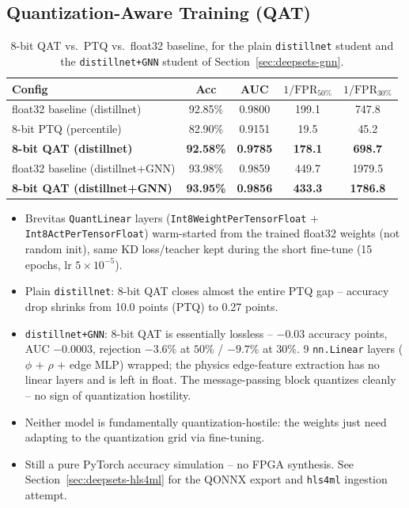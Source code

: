 \subsection{Quantization-Aware Training (QAT)}
\label{sec:deepsets-qat}

\begin{table}[h]
    \centering
    \small
    \begin{tabular}{lcccc}
        \toprule
        Config & Acc & AUC & $1/\mathrm{FPR}_{50\%}$ & $1/\mathrm{FPR}_{30\%}$ \\
        \midrule
        float32 baseline (distillnet) & 92.85\% & 0.9800 & 199.1 & 747.8 \\
        8-bit PTQ (percentile)        & 82.90\% & 0.9151 & 19.5  & 45.2  \\
        \textbf{8-bit QAT (distillnet)} & \textbf{92.58\%} & \textbf{0.9785} & \textbf{178.1} & \textbf{698.7} \\
        \midrule
        float32 baseline (distillnet+GNN)   & 93.98\% & 0.9859 & 449.7 & 1979.5 \\
        \textbf{8-bit QAT (distillnet+GNN)} & \textbf{93.95\%} & \textbf{0.9856} & \textbf{433.3} & \textbf{1786.8} \\
        \bottomrule
    \end{tabular}
    \caption{8-bit QAT vs.\ PTQ vs.\ float32 baseline, for the plain
    \texttt{distillnet} student and the \texttt{distillnet+GNN} student of
    Section~\ref{sec:deepsets-gnn}.}
    \label{tab:deepsets-qat}
\end{table}

\begin{itemize}
    \item Brevitas \texttt{QuantLinear} layers (\texttt{Int8WeightPerTensorFloat}
    $+$ \texttt{Int8ActPerTensorFloat}) warm-started from the trained float32
    weights (not random init), same KD loss/teacher kept during the short
    fine-tune (15 epochs, lr $5\times10^{-5}$).
    \item Plain \texttt{distillnet}: 8-bit QAT closes almost the entire PTQ
    gap -- accuracy drop shrinks from 10.0 points (PTQ) to 0.27 points.
    \item \texttt{distillnet+GNN}: 8-bit QAT is essentially lossless --
    $-0.03$ accuracy points, AUC $-0.0003$, rejection $-3.6\%$ at $50\%$ /
    $-9.7\%$ at $30\%$. 9 \texttt{nn.Linear} layers ($\phi$ $+$ $\rho$ $+$
    edge MLP) wrapped; the physics edge-feature extraction has no linear
    layers and is left in float. The message-passing block quantizes
    cleanly -- no sign of quantization hostility.
    \item Neither model is fundamentally quantization-hostile: the weights
    just need adapting to the quantization grid via fine-tuning.
    \item Still a pure PyTorch accuracy simulation -- no FPGA synthesis.
    See Section~\ref{sec:deepsets-hls4ml} for the QONNX export and
    \texttt{hls4ml} ingestion attempt.
\end{itemize}

